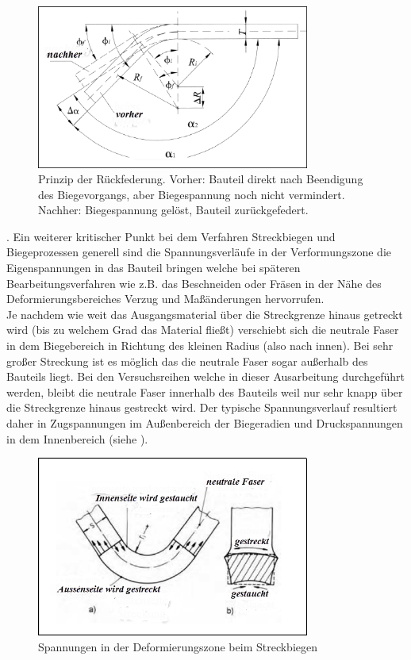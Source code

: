 \documentclass[12pt,a4paper,parskip,twoside,BCOR5mm,headsepline]{scrartcl}
\begin{document}
 \begin{figure}[hbtp]
 \centering
 \includegraphics[width=0.8\textwidth]{springback}
 \caption[Rückfederung]{Prinzip der Rückfederung. Vorher: Bauteil direkt nach Beendigung des Biegevorgangs, aber Biegespannung noch nicht vermindert.
 Nachher: Biegespannung gelöst, Bauteil zurückgefedert.\autocite[65]{smfpd}}
 \label{fig:springback}
 \end{figure}

 . 
Ein weiterer kritischer Punkt bei dem Verfahren Streckbiegen und Biegeprozessen generell sind die Spannungsverläufe in der Verformungszone die Eigenspannungen in das Bauteil bringen welche bei späteren Bearbeitungsverfahren wie z.B. das Beschneiden oder Fräsen in der Nähe des Deformierungsbereiches Verzug und Maßänderungen hervorrufen.\\ Je nachdem wie weit das Ausgangsmaterial über die Streckgrenze hinaus getreckt wird (bis zu welchem Grad das Material fließt) verschiebt sich die neutrale Faser in dem Biegebereich in Richtung des kleinen Radius (also nach innen). Bei sehr großer Streckung ist es möglich das die neutrale Faser sogar außerhalb des Bauteils liegt.\autocite[374]{fu} Bei den Versuchsreihen welche in dieser Ausarbeitung durchgeführt werden, bleibt die neutrale Faser innerhalb des Bauteils weil nur sehr knapp über die Streckgrenze hinaus gestreckt wird. Der typische Spannungsverlauf resultiert daher in Zugspannungen im Außenbereich der Biegeradien und Druckspannungen in dem Innenbereich (siehe ).

\begin{figure}[hbtp]
\centering
\includegraphics[width=0.8\textwidth]{neutralefaser}
\caption{Spannungen in der Deformierungszone beim Streckbiegen\autocite[195]{tsch}}
\label{fig:neutralefaser}
\end{figure}
\end{document}
